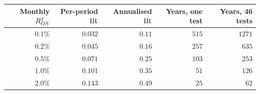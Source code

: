 \begin{tabular}{rrrrr}
    \toprule
    Monthly $R^2_{OS}$ & Per-period $\mathrm{IR}$ & Annualised $\mathrm{IR}$ & Years, one test & Years, 46 tests \\
    \midrule
    $0.1\%$ & $0.032$ & $0.11$ & $515$ & $1271$ \\
    $0.2\%$ & $0.045$ & $0.16$ & $257$ & $635$ \\
    $0.5\%$ & $0.071$ & $0.25$ & $103$ & $253$ \\
    $1.0\%$ & $0.101$ & $0.35$ & $51$ & $126$ \\
    $2.0\%$ & $0.143$ & $0.49$ & $25$ & $62$ \\
    \bottomrule
\end{tabular}
